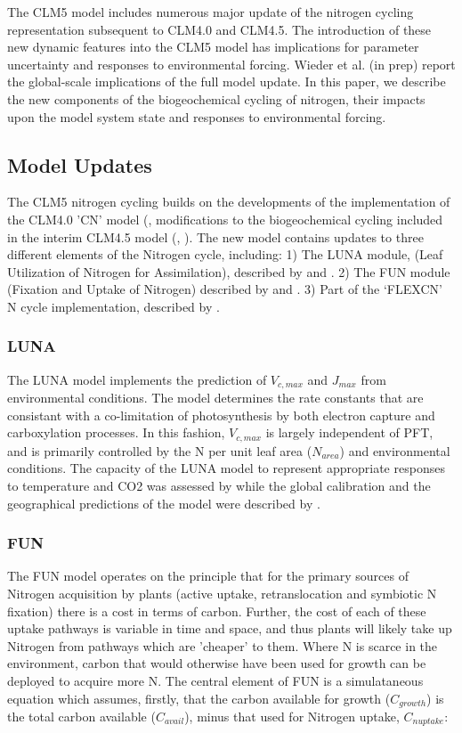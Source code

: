 \documentclass[draft,linenumbers]{agujournal}
\begin{document}
The CLM5 model includes numerous major update of the nitrogen cycling representation subsequent to CLM4.0 and CLM4.5. The introduction of these new dynamic features into the CLM5 model has implications for parameter uncertainty and responses to environmental forcing. Wieder et al. (in prep) report the global-scale implications of the full model update.  In this paper, we describe the new components of the biogeochemical cycling of nitrogen, their impacts upon the model system state and responses to environmental forcing. 


\subsection{Model Updates}
The CLM5 nitrogen cycling builds on the developments of the implementation of the CLM4.0 'CN' model (\cite{Thornton}, modifications to the biogeochemical cycling included in the interim CLM4.5 model (\cite{koven2013}, \cite{bonan2012}).  The new model contains updates to three different elements of the Nitrogen cycle, including: 
1)	The LUNA module, (Leaf Utilization of Nitrogen for Assimilation), described by \cite{xu2012} and \cite{ali2016}. 
2)	The FUN module (Fixation and Uptake of Nitrogen) described by \cite{fisher2010fun} \cite{brzostek2014} and \cite{shi2016}. 
3)	Part of the `FLEXCN' N cycle implementation, described by \cite{ghimire2016}. 

\subsubsection{LUNA}
The LUNA model implements the prediction of $V_{c,max}$ and $J_{max}$ from environmental conditions.   The model determines the rate constants that are consistant with a co-limitation of photosynthesis by both electron capture and carboxylation processes. In this fashion, $V_{c,max}$ is largely independent of PFT, and is primarily controlled by the N per unit leaf area ($N_{area}$) and environmental conditions. The capacity of the LUNA model to represent appropriate responses to temperature and CO2 was assessed by \cite{xu2012} while the global calibration and the geographical predictions of the model were described by \cite{ali2016}.

\subsubsection{FUN}
The FUN model operates on the principle that for the primary sources of Nitrogen acquisition by plants (active uptake, retranslocation and symbiotic N fixation) there is a cost in terms of carbon. Further, the cost of each of these uptake pathways is variable in time and space, and thus plants will likely take up Nitrogen from pathways which are 'cheaper' to them. Where N is scarce in the environment, carbon that would otherwise have been used for growth can be deployed to acquire more N. The central element of FUN is a simulataneous equation which assumes, firstly, that the carbon available for growth ($C_{growth}$) is the total carbon available ($C_{avail}$), minus that used for Nitrogen uptake, $C_{nuptake}$:
\end{document}
